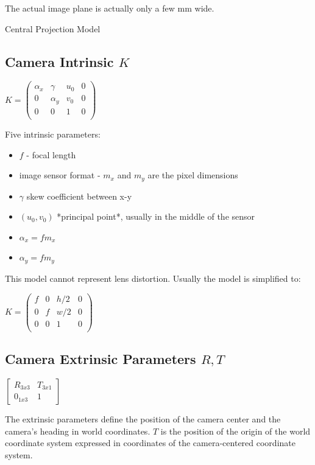 The actual image plane is actually only a few mm wide.

Central Projection Model
\subsection{Camera Intrinsic $K$}
$K = \left( \begin{matrix} 
\alpha_x & \gamma & u_0 & 0 \\
0 & \alpha_y  & v_0 & 0 \\
0 & 0 &  1 & 0 \\
\end{matrix}
\right) $

Five intrinsic parameters:
\begin{itemize}
\item $f$ - focal length
\item  image sensor format - $m_x$ and $m_y$ are the pixel dimensions
\item  $\gamma$ skew coefficient between x-y
\item  $(u_0,v_0)$ *principal point*, usually in the middle of the sensor
\item  $\alpha_x = f m_x $
\item  $\alpha_y = f m_y $
\end{itemize}

This model cannot represent lens distortion. Usually the model is simplified to:

$ K = \left( \begin{matrix} 
f & 0 & h/2 & 0 \\
0 & f  & w/2 & 0 \\
0 & 0 &  1 & 0 \\
\end{matrix}
\right) $

\subsection{Camera Extrinsic Parameters $R,T$}

$ \left[ 
\begin{matrix} 
R_{3x3} & T_{3x1} \\
0_{1x3} & 1 
\end{matrix}
\right] $

The extrinsic parameters define the position of the camera center and the camera's heading in world coordinates. $T$ is the position of the origin of the world coordinate system expressed in coordinates of the camera-centered coordinate system. 

